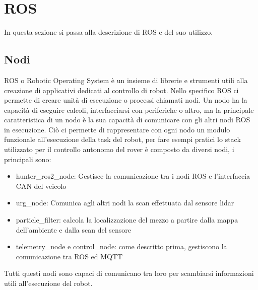 \section{ROS}
In questa sezione si passa alla descrizione di ROS e del suo utilizzo.
\subsection{Nodi}
ROS o Robotic Operating System è un insieme di librerie e strumenti utili alla creazione di applicativi dedicati al controllo di robot.
Nello specifico ROS ci permette di creare unità di esecuzione o processi chiamati nodi. Un nodo ha la capacità di eseguire calcoli, interfacciarsi con periferiche o altro, ma la principale caratteristica di un nodo è la sua capacità di comunicare con gli altri nodi ROS in esecuzione.
\noindent Ciò ci permette di rappresentare con ogni nodo un modulo funzionale all'esecuzione della task del robot, per fare esempi pratici lo stack utilizzato per il controllo autonomo del rover è composto da diversi nodi, i principali sono: 
\noindent \begin{itemize}
  \item hunter_ros2_node: Gestisce la comunicazione tra i nodi ROS e l'interfaccia CAN del veicolo
  \item urg_node: Comunica agli altri nodi la scan effettuata dal sensore lidar
  \item particle_filter: calcola la localizzazione del mezzo a partire dalla mappa dell'ambiente e dalla scan del sensore
  \item telemetry_node e control_node: come descritto prima, gestiscono la comunicazione tra ROS ed MQTT 
\end{itemize}
Tutti questi nodi sono capaci di comunicano tra loro per scambiarsi informazioni utili all'esecuzione del robot.
